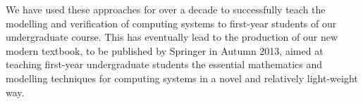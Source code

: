 \documentclass[sigconf]{acmart}
\begin{document}
We have used these approaches for over a decade to successfully teach
the modelling and verification of computing systems to first-year
students of our undergraduate course. This has eventually lead to the
production of our new modern textbook, to be published by Springer in
Autumn 2013, aimed at teaching first-year undergraduate students the
essential mathematics and modelling techniques for computing systems
in a novel and relatively light-weight way.





 
\end{document}
